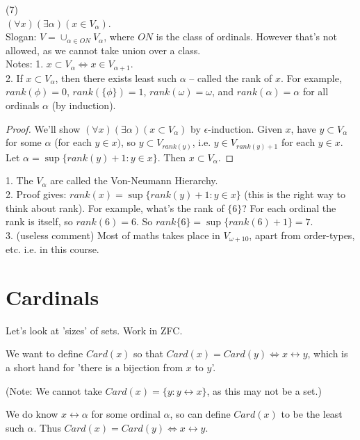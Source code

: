 \documentclass[a4paper]{article}
\begin{document}
\begin{thm} (7)\\
$(\forall x) (\exists \alpha) (x \in V_\alpha)$.\\
Slogan: $V = \cup_{\alpha \in ON} V_\alpha$, where $ON$ is the class of ordinals. However that's not allowed, as we cannot take union over a class.\\
Notes: 1. $x \subset V_\alpha \iff x \in V_{\alpha+1}$.\\
2. If $x \subset V_\alpha$, then there exists least such $\alpha$ -- called the rank of $x$. For example, $rank(\phi) = 0$, $rank(\{\phi\}) = 1$, $rank(\omega) = \omega$, and $rank(\alpha) = \alpha$ for all ordinals $\alpha$ (by induction).
\begin{proof}
We'll show $(\forall x) (\exists \alpha) (x \subset V_\alpha)$ by $\epsilon$-induction. Given $x$, have $y \subset V_\alpha$ for some $\alpha$ (for each $y \in x)$, so $y \subset V_{rank(y)}$, i.e. $y \in V_{rank(y)+1}$ for each $y \in x$.\\
Let $\alpha =\sup \{ rank(y) + 1: y \in x\}$. Then $x \subset V_\alpha$.
\end{proof}
\end{thm}

\begin{rem}
1. The $V_\alpha$ are called the Von-Neumann Hierarchy.\\
2. Proof gives: $rank(x) = \sup\{rank(y)+1: y \in x\}$ (this is the right way to think about rank). For example, what's the rank of $\{6\}$? For each ordinal the rank is itself, so $rank(6) = 6$. So $rank\{6\} =\sup\{rank(6)+1\} = 7$.\\
3. (useless comment) Most of maths takes place in $V_{\omega+10}$, apart from order-types, etc. i.e. in this course.
\end{rem}

\section{Cardinals}
Let's look at 'sizes' of sets. Work in ZFC.

We want to define $Card(x)$ so that $Card(x) = Card(y) \iff x \leftrightarrow y$, which is a short hand for 'there is a bijection from $x$ to $y$'.

(Note: We cannot take $Card(x) = \{y:y \leftrightarrow x\}$, as this may not be a set.)

We do know $x \leftrightarrow \alpha$ for some ordinal $\alpha$, so can define $Card(x)$ to be the least such $\alpha$. Thus $Card(x) = Card(y) \iff x \leftrightarrow y$. 
\end{document}

